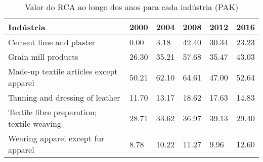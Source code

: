 \begin{table}
\centering
\caption{Valor do RCA ao longo dos anos para cada indústria (PAK)}
\label{tab:ex3-tempo-PAK}
\begin{tabular}{p{6cm}p{1.5cm}p{1.5cm}p{1.5cm}p{1.5cm}p{1.5cm}}
\toprule
                                 Indústria &  2000 &  2004 &  2008 &  2012 &  2016 \\
\midrule
                   Cement lime and plaster &  0.00 &  3.18 & 42.40 & 30.34 & 23.23 \\
                       Grain mill products & 26.30 & 35.21 & 57.68 & 35.47 & 43.03 \\
   Made-up textile articles except apparel & 50.21 & 62.10 & 64.61 & 47.00 & 52.64 \\
           Tanning and dressing of leather & 11.70 & 13.17 & 18.62 & 17.63 & 14.83 \\
Textile fibre preparation; textile weaving & 28.71 & 33.62 & 36.97 & 39.13 & 29.40 \\
        Wearing apparel except fur apparel &  8.78 & 10.22 & 11.27 &  9.96 & 12.60 \\
\bottomrule
\end{tabular}
\end{table}
